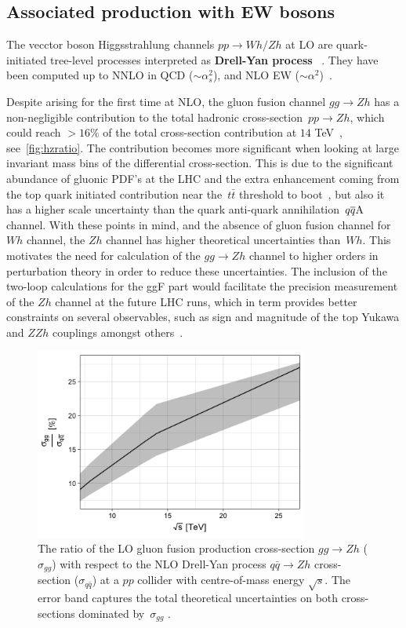 \subsection{Associated production with EW bosons \label{vhproduction}}
The vecctor boson Higgsstrahlung channels $pp\to Wh/Zh$ at LO are quark-initiated tree-level processes  interpreted as \textbf{Drell-Yan process}~ \cite{Han:1991ia,Brein:2003wg}. They have been computed up to  NNLO in QCD ($\sim \alpha_s^2$), and  NLO  EW  ($\sim \alpha^2 $)~\cite{Amoroso:2020lgh}.
\par Despite arising for the first time at NLO, the gluon fusion channel $g g \rightarrow Zh$ has a non-negligible contribution to the total hadronic cross-section~$pp\to Zh$, which could reach $>16\%$ of the total cross-section contribution at $14$ TeV~\cite{Cepeda:2019klc}, see~\autoref{fig:hzratio}. The contribution becomes more significant when looking at large invariant mass bins of the differential cross-section. This is due to the significant abundance of gluonic PDF's at the LHC and the extra enhancement coming from the top quark initiated contribution near the~$t\bar t$ threshold to boot~\cite{Englert:2013vua}, but also it has a higher scale uncertainty than the quark anti-quark annihilation~$q\overline q \rm A$ channel.  With these points in mind, and the absence of gluon fusion channel for $Wh$ channel, the $Zh$ channel has higher theoretical uncertainties than~$Wh$. This motivates the need for calculation of the  $g g \rightarrow Z h$ channel to higher orders in perturbation theory in order to reduce these uncertainties. The inclusion of the two-loop calculations for the ggF part would facilitate the precision measurement of the $Zh$ channel at the future LHC runs, which in term provides better constraints on several observables, such as sign and magnitude of the top Yukawa and $ZZh$ couplings amongst others~\cite{Englert:2016hvy}.
\begin{figure}
	\begin{center}
		\includegraphics[width=9cm]{./figures/Rplot}
		\caption{The ratio of the LO gluon fusion production cross-section $ gg \to Zh$  ($\sigma_{gg}$) with respect to the NLO Drell-Yan process $ q\bar{q} \to Zh$ cross-section ($\sigma_{q\bar{q}}$) at a $pp$ collider with centre-of-mass energy $\sqrt{s}$. The error band captures the total theoretical uncertainties on both cross-sections dominated by~$\sigma_{gg}$ .}
		\label{fig:hzratio}
	\end{center}
\end{figure}
